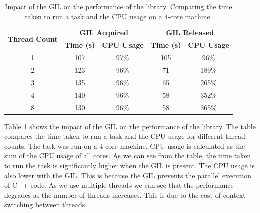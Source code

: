 \begin{spacing}{1.2}
    \begin{table}
        \centering
        \begin{tabular}{|c|c|c|c|c|}
            \hline
            \multirow{2}{*}{\textbf{Thread Count}} & \multicolumn{2}{c|}{\textbf{GIL Acquired}} & \multicolumn{2}{c|}{\textbf{GIL Released}}                                          \\
                                                   & \textbf{Time (s)}                      & \textbf{CPU Usage}                        & \textbf{Time (s)} & \textbf{CPU Usage} \\
            \hline
            1                                      & 107                                    & 97\%                                      & 105               & 96\%               \\
            2                                      & 123                                    & 96\%                                      & 71                & 189\%              \\
            3                                      & 135                                    & 96\%                                      & 65                & 265\%              \\
            4                                      & 140                                    & 96\%                                      & 58                & 352\%              \\
            8                                      & 130                                    & 96\%                                      & 58                & 365\%              \\
            \hline
        \end{tabular}
        \caption{Impact of the GIL on the performance of the library. Comparing the time taken to run a task and the CPU usage
            on a 4-core machine.}
        \label{tab:gil_impact}
    \end{table}


    Table \ref{tab:gil_impact} shows the impact of the GIL on the performance of the library. The table compares the time
    taken to run a task and the CPU usage for different thread counts. The task was run on a 4-core machine. CPU usage is
    calculated as the sum of the CPU usage of all cores. As we can see from the table, the time taken to run the task is
    significantly higher when the GIL is present. The CPU usage is also lower with the GIL. This is because
    the GIL prevents the parallel execution of C++ code. As we use multiple threads we can see that the performance degrades
    as the number of threads increases. This is due to the cost of context switching between threads.\\


\end{spacing}

